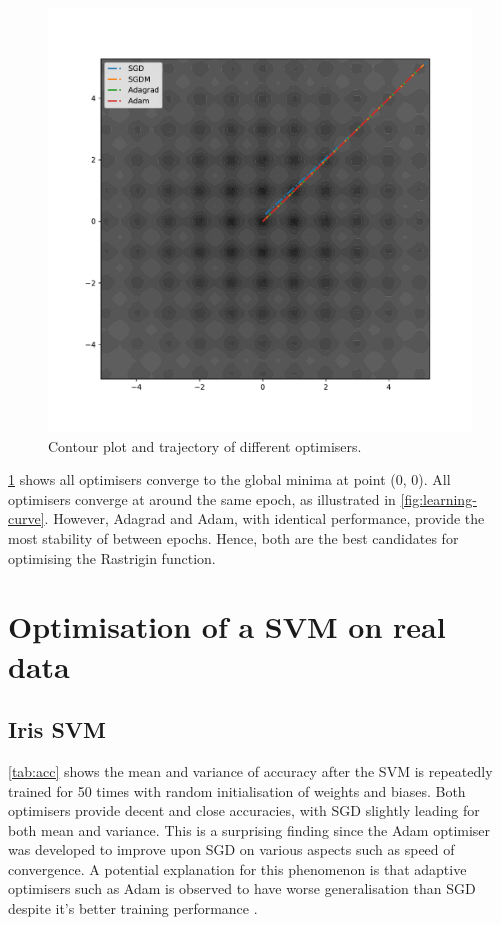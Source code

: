 \documentclass[twocolumn]{article}
\begin{document}
\begin{figure}
    \centering
    \includegraphics[width=\linewidth]{Figures/contour_plot.pdf}
    \caption{Contour plot and trajectory of different optimisers.}
    \label{fig:contour}
\end{figure}

\cref{fig:contour} shows all optimisers converge to the global minima at point (0, 0). All optimisers converge at around the same epoch, as illustrated in \cref{fig:learning-curve}. However, Adagrad and Adam, with identical performance, provide the most stability of between epochs. Hence, both are the best candidates for optimising the Rastrigin function.

\section{Optimisation of a SVM on real data}

\subsection{Iris SVM}

\cref{tab:acc} shows the mean and variance of accuracy after the SVM is repeatedly trained for 50 times with random initialisation of weights and biases. Both optimisers provide decent and close accuracies, with SGD slightly leading for both mean and variance. This is a surprising finding since the Adam optimiser was developed to improve upon SGD on various aspects such as speed of convergence. A potential explanation for this phenomenon is that adaptive optimisers such as Adam is observed to have worse generalisation than SGD despite it's better training performance \autocite{wilsonMarginalValueAdaptive2018}.
\end{document}
